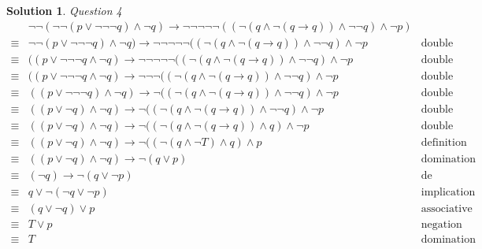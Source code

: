 \documentclass{article}
\theoremstyle{definition}
\newtheorem*{solution}{Solution}
\begin{document}
\begin{solution}
 \textit{Question 4}
 \begin{align*}
 & \neg \neg (\neg \neg (p \vee \neg \neg \neg q) \wedge \neg q) \to \neg \neg \neg \neg \neg ((\neg (q \wedge \neg (q \to q)) \wedge \neg \neg q) \wedge \neg p)\\
 \equiv & \neg \neg (p \vee \neg \neg \neg q) \wedge \neg q) \to \neg \neg \neg \neg \neg ((\neg (q \wedge \neg (q \to q)) \wedge \neg \neg q) \wedge \neg p & \text{double negation}\\
 \equiv & ((p \vee \neg \neg \neg q \wedge \neg q) \to \neg \neg \neg \neg \neg ((\neg (q \wedge \neg (q \to q)) \wedge \neg \neg q) \wedge \neg p & \text{double negation}\\
 \equiv & ((p \vee \neg \neg \neg q \wedge \neg q) \to \neg \neg \neg ((\neg (q \wedge \neg (q \to q)) \wedge \neg \neg q) \wedge \neg p & \text{double negation}\\
 \equiv & ((p \vee \neg \neg \neg q) \wedge \neg q) \to \neg ((\neg (q \wedge \neg (q \to q)) \wedge \neg \neg q) \wedge \neg p & \text{double negation}\\
 \equiv & ((p \vee \neg q) \wedge \neg q) \to \neg ((\neg (q \wedge \neg (q \to q)) \wedge \neg \neg q) \wedge \neg p & \text{double negation}\\
 \equiv & ((p \vee \neg q) \wedge \neg q) \to \neg ((\neg (q \wedge \neg (q \to q)) \wedge q) \wedge \neg p & \text{double negation}\\
 \equiv & ((p \vee \neg q) \wedge \neg q) \to \neg ((\neg (q \wedge \neg T) \wedge q) \wedge p & \text{definition of implication}\\
 \equiv & ((p \vee \neg q) \wedge \neg q) \to \neg (q \vee p) & \text{domination}\\
 \equiv & (\neg q) \to \neg (q \vee \neg p) & \text{de morgans}\\
 \equiv & q \vee \neg (\neg q \vee \neg p) & \text{implication}\\
 \equiv & (q \vee \neg q) \vee p & \text{associative}\\
 \equiv & T \vee p & \text{negation}\\
 \equiv & T & \text{domination}\\
 \end{align*}
 

\end{solution}
\end{document}
